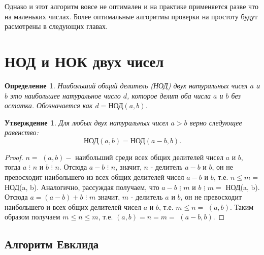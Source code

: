 \documentclass[12pt, a4paper, openany]{book}
\newtheorem*{definition}{Определение}
\newtheorem*{statement}{Утверждение}
\begin{document}
    Однако и этот алгоритм вовсе не оптимален и на практике применяется разве что на маленьких числах. Более оптимальные алгоритмы проверки на простоту будут расмотрены в следующих главах.

\newpage
\section{НОД и НОК двух чисел}

\begin{definition}
    Наибольший общий делитель (НОД) двух натуральных чисел \(a\) и \(b\) это наибольшее натуральное число \(d\), которое делит оба числа \(a\) и \(b\) без остатка. Обозначается как \(d = \text{НОД}(a, b)\).
\end{definition}

\begin{statement}
    Для любых двух натуральных чисел $a > b$ верно следующее равенство:
    \begin{equation*}
    \text{НОД}(a, b) = \text{НОД}(a - b, b).
    \end{equation*}
\end{statement}

\begin{proof}
    $n=$ $(a, b) - $ наибольший среди всех общих делителей чисел $a$ и $b$, тогда $a$ $\vdots$ $n$ и $b$ $\vdots$ $n$.
    Отсюда $a-b$ $\vdots$ $n$, значит, $n$ - делитель $a-b$ и $b$, он не превосходит наибольшего из всех общих делителей чисел $a-b$ и $b$, т.е. $n \leqslant m=$ $\text{НОД}$(a, b). Аналогично, рассуждая получаем, что $a-b$ $\vdots$ $m$ и $b$ $\vdots$ $m=$ $\text{НОД}$(a, b). Отсюда $a=(a-b)+b$ $\vdots$ $m$ значит, $m$ - делитель $a$ и $b$, он не превосходит наибольшего и всех общих делителей чисел $a$ и $b$, т.е. $m \leqslant n=$ $(a, b)$. Таким образом получаем $m \leqslant n \leqslant m$, т.е. $(a, b)=n=m=$ $(a-b, b)$.
\end{proof}

\noindent
\subsection{Алгоритм Евклида}
\end{document}
